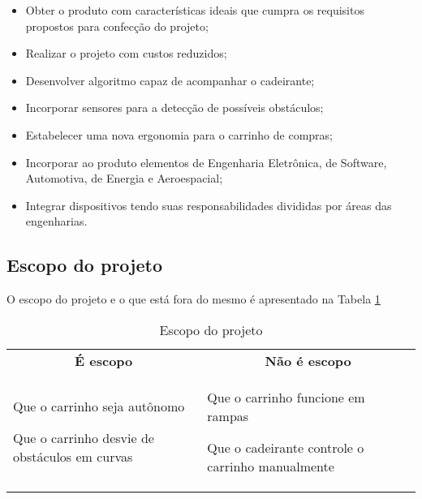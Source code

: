 \begin{itemize}  
\item Obter o produto com características ideais que cumpra os requisitos propostos para confecção do projeto;
\item Realizar o projeto com custos reduzidos;
\item Desenvolver algoritmo capaz de acompanhar o cadeirante;
\item Incorporar sensores para a detecção de possíveis obstáculos;
\item Estabelecer uma nova ergonomia para o carrinho de compras;
\item Incorporar ao produto elementos de Engenharia Eletrônica, de Software, Automotiva, de Energia e Aeroespacial;
\item Integrar dispositivos tendo suas responsabilidades divididas por áreas das engenharias.
\end{itemize}


\subsection{Escopo do projeto}

O escopo do projeto e o que está fora do mesmo é apresentado na Tabela \ref{tab:escopo}

\begin{table}[h]
 \centering
 {\renewcommand\arraystretch{1.25}
 \caption{Escopo do projeto}
 \label{tab:escopo}
 \begin{tabular}{ l l }
  \cline{1-1}\cline{2-2}  
    \multicolumn{1}{c|}{\textbf{É escopo} \centering } &
    \multicolumn{1}{c}{\textbf{Não é escopo} \centering }
  \\  
  \cline{1-1}\cline{2-2}  
    \multicolumn{1}{p{3.850cm}|}{\begin{center}Que o carrinho seja autônomo
\end{center}  			


\begin{center}Que o carrinho desvie de obstáculos em curvas
\end{center}} &
    \multicolumn{1}{p{4.217cm}}{\begin{center}Que o carrinho funcione em rampas
\end{center}  			


\begin{center}Que o cadeirante controle o carrinho manualmente
\end{center}}
  \\  
  \hline

 \end{tabular} }
\end{table}


